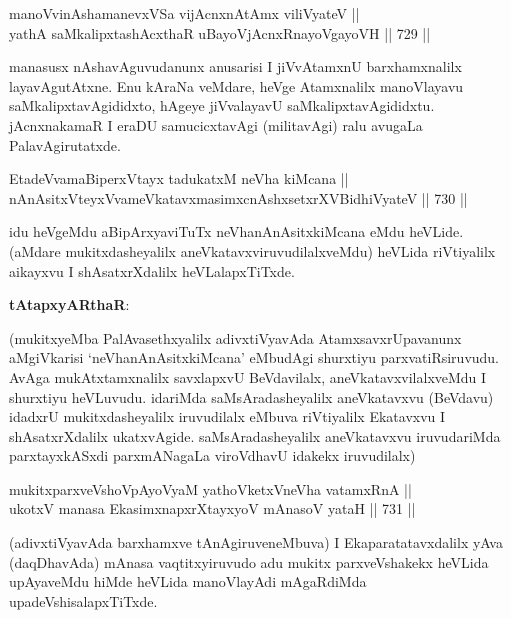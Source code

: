 \begin{shl}
manoVvinAshamanevxVSa vijAcnxnAtAmx viliVyateV || \\
yathA saMkalipxtashAcxthaR uBayoVjAcnxRnayoVgayoVH \hfill || 729 ||  
\end{shl}

\begin{artha} 
manasusx nAshavAguvudanunx anusarisi I jiVvAtamxnU barxhamxnalilx layavAgutAtxne. Enu kAraNa veMdare, heVge Atamxnalilx manoVlayavu saMkalipxtavAgididxto, hAgeye jiVvalayavU saMkalipxtavAgididxtu. jAcnxnakamaR I eraDU samucicxtavAgi (militavAgi) ralu avugaLa PalavAgirutatxde.
\end{artha}



\begin{shl}
EtadeVvamaBiperxVtayx tadukatxM neVha kiMcana || \\
nAnA\s sitxVteyxVvameVkatavxmasimxcnAshxsetxrXV\s BidhiVyateV \hfill || 730 ||  
\end{shl}

\begin{artha} 
idu heVgeMdu aBipArxyaviTuTx neVhanAnAsitxkiMcana eMdu heVLide. (aMdare mukitxdasheyalilx aneVkatavxviruvudilalxveMdu) heVLida riVtiyalilx aikayxvu I shAsatxrXdalilx heVLalapxTiTxde.
\end{artha}


\textbf{tAtapxyARthaR}:

(mukitxyeMba PalAvasethxyalilx adivxtiVyavAda 
AtamxsavxrUpavanunx 
aMgiVkarisi `neVhanAnAsitxkiMcana' eMbudAgi shurxtiyu 
parxvatiRsiruvudu. AvAga mukAtxtamxnalilx savxlapxvU BeVdavilalx, 
aneVkatavxvilalxveMdu I shurxtiyu heVLuvudu. idariMda 
saMsAradasheyalilx aneVkatavxvu (BeVdavu) idadxrU mukitxdasheyalilx 
iruvudilalx eMbuva riVtiyalilx Ekatavxvu I shAsatxrXdalilx 
ukatxvAgide. saMsAradasheyalilx aneVkatavxvu iruvudariMda 
parxtayxkASxdi parxmANagaLa viroVdhavU idakekx iruvudilalx)
	

\begin{shl}
mukitxparxveVshoVpAyoV\s yaM yathoVketxVneVha vatamxRnA || \\
ukotxV manasa EkasimxnapxrXtayxyoV mAnasoV yataH \hfill || 731 ||  
\end{shl}

\begin{artha} 
(adivxtiVyavAda barxhamxve tAnAgiruveneMbuva) I Ekaparatatavxdalilx 
yAva (daqDhavAda) mAnasa vaqtitxyiruvudo adu mukitx parxveVshakekx 
heVLida upAyaveMdu hiMde heVLida manoVlayAdi mAgaRdiMda 
upadeVshisalapxTiTxde.
\end{artha}


